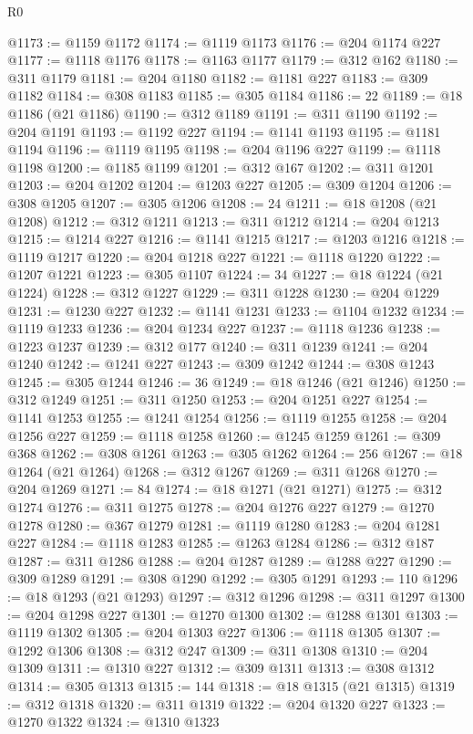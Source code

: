 \begin{lexlean}{R0}
\begin{coremodule}
@1173 := @1159 @1172
@1174 := @1119 @1173
@1176 := @204 @1174 @227
@1177 := @1118 @1176
@1178 := @1163 @1177
@1179 := @312 @162
@1180 := @311 @1179
@1181 := @204 @1180
@1182 := @1181 @227
@1183 := @309 @1182
@1184 := @308 @1183
@1185 := @305 @1184
@1186 := 22
@1189 := @18 @1186 (@21 @1186)
@1190 := @312 @1189
@1191 := @311 @1190
@1192 := @204 @1191
@1193 := @1192 @227
@1194 := @1141 @1193
@1195 := @1181 @1194
@1196 := @1119 @1195
@1198 := @204 @1196 @227
@1199 := @1118 @1198
@1200 := @1185 @1199
@1201 := @312 @167
@1202 := @311 @1201
@1203 := @204 @1202
@1204 := @1203 @227
@1205 := @309 @1204
@1206 := @308 @1205
@1207 := @305 @1206
@1208 := 24
@1211 := @18 @1208 (@21 @1208)
@1212 := @312 @1211
@1213 := @311 @1212
@1214 := @204 @1213
@1215 := @1214 @227
@1216 := @1141 @1215
@1217 := @1203 @1216
@1218 := @1119 @1217
@1220 := @204 @1218 @227
@1221 := @1118 @1220
@1222 := @1207 @1221
@1223 := @305 @1107
@1224 := 34
@1227 := @18 @1224 (@21 @1224)
@1228 := @312 @1227
@1229 := @311 @1228
@1230 := @204 @1229
@1231 := @1230 @227
@1232 := @1141 @1231
@1233 := @1104 @1232
@1234 := @1119 @1233
@1236 := @204 @1234 @227
@1237 := @1118 @1236
@1238 := @1223 @1237
@1239 := @312 @177
@1240 := @311 @1239
@1241 := @204 @1240
@1242 := @1241 @227
@1243 := @309 @1242
@1244 := @308 @1243
@1245 := @305 @1244
@1246 := 36
@1249 := @18 @1246 (@21 @1246)
@1250 := @312 @1249
@1251 := @311 @1250
@1253 := @204 @1251 @227
@1254 := @1141 @1253
@1255 := @1241 @1254
@1256 := @1119 @1255
@1258 := @204 @1256 @227
@1259 := @1118 @1258
@1260 := @1245 @1259
@1261 := @309 @368
@1262 := @308 @1261
@1263 := @305 @1262
@1264 := 256
@1267 := @18 @1264 (@21 @1264)
@1268 := @312 @1267
@1269 := @311 @1268
@1270 := @204 @1269
@1271 := 84
@1274 := @18 @1271 (@21 @1271)
@1275 := @312 @1274
@1276 := @311 @1275
@1278 := @204 @1276 @227
@1279 := @1270 @1278
@1280 := @367 @1279
@1281 := @1119 @1280
@1283 := @204 @1281 @227
@1284 := @1118 @1283
@1285 := @1263 @1284
@1286 := @312 @187
@1287 := @311 @1286
@1288 := @204 @1287
@1289 := @1288 @227
@1290 := @309 @1289
@1291 := @308 @1290
@1292 := @305 @1291
@1293 := 110
@1296 := @18 @1293 (@21 @1293)
@1297 := @312 @1296
@1298 := @311 @1297
@1300 := @204 @1298 @227
@1301 := @1270 @1300
@1302 := @1288 @1301
@1303 := @1119 @1302
@1305 := @204 @1303 @227
@1306 := @1118 @1305
@1307 := @1292 @1306
@1308 := @312 @247
@1309 := @311 @1308
@1310 := @204 @1309
@1311 := @1310 @227
@1312 := @309 @1311
@1313 := @308 @1312
@1314 := @305 @1313
@1315 := 144
@1318 := @18 @1315 (@21 @1315)
@1319 := @312 @1318
@1320 := @311 @1319
@1322 := @204 @1320 @227
@1323 := @1270 @1322
@1324 := @1310 @1323

\end{coremodule}
\end{lexlean}
